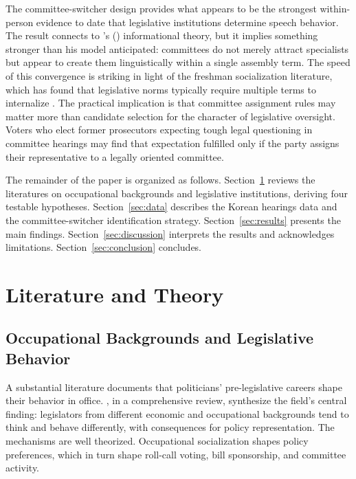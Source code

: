 \documentclass[11pt]{article}
\begin{document}
The committee-switcher design provides what appears to be the strongest within-person evidence to date that legislative institutions determine speech behavior. The result connects to \citeauthor{krehbiel1991}'s (\citeyear{krehbiel1991}) informational theory, but it implies something stronger than his model anticipated: committees do not merely attract specialists but appear to create them linguistically within a single assembly term. The speed of this convergence is striking in light of the freshman socialization literature, which has found that legislative norms typically require multiple terms to internalize \citep{asher1973, crook1985}. The practical implication is that committee assignment rules may matter more than candidate selection for the character of legislative oversight. Voters who elect former prosecutors expecting tough legal questioning in committee hearings may find that expectation fulfilled only if the party assigns their representative to a legally oriented committee.

The remainder of the paper is organized as follows. Section~\ref{sec:lit} reviews the literatures on occupational backgrounds and legislative institutions, deriving four testable hypotheses. Section~\ref{sec:data} describes the Korean hearings data and the committee-switcher identification strategy. Section~\ref{sec:results} presents the main findings. Section~\ref{sec:discussion} interprets the results and acknowledges limitations. Section~\ref{sec:conclusion} concludes.


\section{Literature and Theory}
\label{sec:lit}

\subsection{Occupational Backgrounds and Legislative Behavior}

A substantial literature documents that politicians' pre-legislative careers shape their behavior in office. \citet{carnes2023}, in a comprehensive review, synthesize the field's central finding: legislators from different economic and occupational backgrounds tend to think and behave differently, with consequences for policy representation. The mechanisms are well theorized. Occupational socialization shapes policy preferences, which in turn shape roll-call voting, bill sponsorship, and committee activity.
\end{document}
